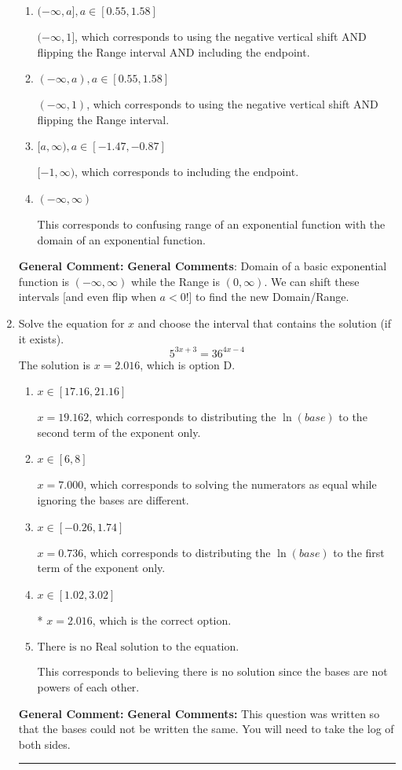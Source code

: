 \documentclass{extbook}[14pt]
\newcommand{\litem}[1]{\item #1

\rule{\textwidth}{0.4pt}}
\begin{document}
\begin{enumerate}
{\begin{enumerate}[label=\Alph*.]
* $(-1, \infty)$, which is the correct option.
\item \( (-\infty, a], a \in [0.55, 1.58] \)

$(-\infty, 1]$, which corresponds to using the negative vertical shift AND flipping the Range interval AND including the endpoint.
\item \( (-\infty, a), a \in [0.55, 1.58] \)

$(-\infty, 1)$, which corresponds to using the negative vertical shift AND flipping the Range interval.
\item \( [a, \infty), a \in [-1.47, -0.87] \)

$[-1, \infty)$, which corresponds to including the endpoint.
\item \( (-\infty, \infty) \)

This corresponds to confusing range of an exponential function with the domain of an exponential function.
\end{enumerate}

\textbf{General Comment:} \textbf{General Comments}: Domain of a basic exponential function is $(-\infty, \infty)$ while the Range is $(0, \infty)$. We can shift these intervals [and even flip when $a<0$!] to find the new Domain/Range.
}
\litem{
Solve the equation for $x$ and choose the interval that contains the solution (if it exists).
\[ 5^{3x+3} = 36^{4x-4} \]The solution is \( x = 2.016 \), which is option D.\begin{enumerate}[label=\Alph*.]
\item \( x \in [17.16, 21.16] \)

$x = 19.162$, which corresponds to distributing the $\ln(base)$ to the second term of the exponent only.
\item \( x \in [6, 8] \)

$x = 7.000$, which corresponds to solving the numerators as equal while ignoring the bases are different.
\item \( x \in [-0.26, 1.74] \)

$x = 0.736$, which corresponds to distributing the $\ln(base)$ to the first term of the exponent only.
\item \( x \in [1.02, 3.02] \)

* $x = 2.016$, which is the correct option.
\item \( \text{There is no Real solution to the equation.} \)

This corresponds to believing there is no solution since the bases are not powers of each other.
\end{enumerate}

\textbf{General Comment:} \textbf{General Comments:} This question was written so that the bases could not be written the same. You will need to take the log of both sides.
}
\end{enumerate}
\end{document}
